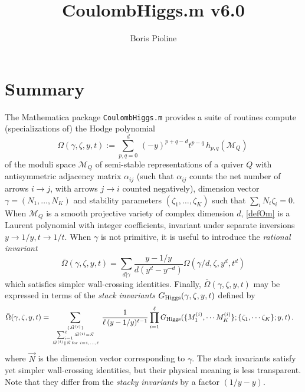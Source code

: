 \documentclass[12pt]{JHEP3}
\title{CoulombHiggs.m v6.0}
\author{Boris Pioline}
\newcommand{\be}{\begin{equation}}
\newcommand{\ee}{\end{equation}}
\newcommand\bOm{\bar\Omega}
\newcommand{\cM}{\mathcal{M}}
\newcommand{\gR}{G_{\rm Higgs}}
\begin{document}
\maketitle

\baselineskip 15pt

\tableofcontents

\medskip

\section{Summary}

The  {\sc Mathematica} package {\tt CoulombHiggs.m} provides a suite of routines compute (specializations of) the Hodge polynomial 
\be
\label{defOm}
\Omega(\gamma,\zeta,y,t) := 
\sum_{p,q=0}^{d}\, (-y)^{p+q-d} t^{p-q}\, h_{p,q}(\cM_Q)\, 
\ee
of the moduli space $\cM_Q$ of semi-stable representations of a quiver $Q$ with antisymmetric
adjacency matrix $\alpha_{ij}$ (such that $\alpha_{ij}$ counts the net number of arrows $i\to j$, with
arrows $j\to i$ counted negatively),  dimension vector $\gamma=(N_1,\dots, N_K)$ and stability parameters $(\zeta_1,\dots, \zeta_K)$ such that $\sum_i N_i \zeta_i=0$. When $\cM_Q$ is 
a smooth projective variety of complex dimension $d$, \eqref{defOm} is a Laurent polynomial  with integer coefficients, invariant under separate inversions $y\to 1/y, t\to 1/t$. When $\gamma$ is not primitive, it is useful to introduce the {\it rational invariant}
\be
\label{defbOm}
\bOm(\gamma,\zeta,y,t)=\sum_{d|\gamma} \frac{y-1/y}{d(y^d-y^{-d})} \Omega(\gamma/d,\zeta,y^d,t^d)\ee 
which satisfies simpler wall-crossing identities. Finally, $\bOm(\gamma,\zeta,y,t)$ may be expressed 
in terms of the {\it stack invariants} $G_{\rm Higgs}(\gamma,\zeta,y,t)$ defined by \cite[(4.1)]{Manschot:2013sya}
\be
\label{eq:inversestackinv}
\begin{split}
\bOm(\gamma,\zeta,y,t) 
  =& %
  \sum_{\{\vec M^{(i)}\} \atop {
  \sum_{i=1}^\ell \vec M^{(i)}=\vec N \atop  \vec M^{(i)}\parallel \vec N
  \,\mathrm{for}\,\, i=1,\dots,\ell}}
\frac{1}{\ell\,(y-1/y)^{\ell-1}}  
\prod_{i=1}^\ell 
\gR(\{ M^{(i)}_1, \cdots M^{(i)}_K \};
\{\zeta_1, \cdots \zeta_K\};y,t)
\, .  
\end{split}
\ee
where $\vec N$ is the dimension vector corresponding to $\gamma$. The stack invariants 
satisfy yet simpler wall-crossing identities, but their physical meaning is less transparent.
Note that they differ from the {\it stacky invariants} by a factor $(1/y-y)$.
\end{document}
